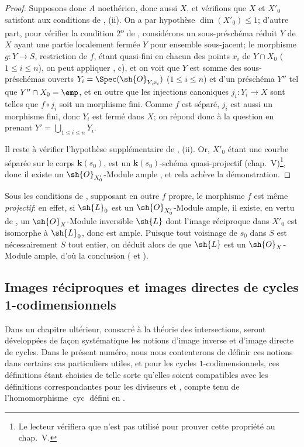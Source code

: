 \begin{proof}
Supposons donc $A$ noethérien, donc aussi $X$, et vérifions que $X$ et $X'_0$ satisfont aux conditions de , (ii).
On a par hypothèse $\dim(X'_0)\leq1$;
d'autre part, pour vérifier la condition 2\textsuperscript{o} de , considérons un sous-préschéma réduit $Y$ de $X$ ayant une partie localement fermée $Y$ pour ensemble sous-jacent;
le morphisme $g:Y\to S$, restriction de $f$, étant quasi-fini en chacun des points $x_i$ de $Y\cap X_0$ ($1\leq i\leq n$), on peut appliquer , c), et on voit que $Y$ est somme des sous-préschémas ouverts $Y_i=\Spec(\sh{O}_{Y,x_i})$ ($1\leq i\leq n$) et d'un préschéma $Y''$ tel que $Y''\cap X_0=\emp$, et en outre que les injections canoniques $j_i:Y_i\to X$ sont telles que $f\circ j_i$ soit un morphisme fini.
Comme $f$ est séparé, $j_i$ est aussi un morphisme fini, donc $Y_i$ est fermé dans $X$;
on répond donc à la question en prenant $Y'=\bigcup_{1\leq i\leq n}Y_i$.

Il reste à vérifier l'hypothèse supplémentaire de , (ii).
Or, $X'_0$ étant une courbe séparée sur le corps $\boldsymbol{k}(s_0)$, est un $\boldsymbol{k}(s_0)$-schéma quasi-projectif (chap.~V)\footnote{Le lecteur vérifiera que  n'est pas utilisé pour prouver cette propriété au chap.~V.}, donc il existe un $\sh{O}_{X'_0}$-Module ample , et cela achève la démonstration.
\end{proof}

\begin{remark}[21.9.13]
\label{IV.21.9.13}
Sous les conditions de , supposant en outre $f$ propre, le morphisme $f$ est même \emph{projectif}:
en effet, si $\sh{L}_0$ est un $\sh{O}_{X'_0}$-Module ample, il existe, en vertu de , un $\sh{O}_X$-Module inversible $\sh{L}$ dont l'image réciproque dans $X'_0$ est isomorphe à $\sh{L}_0$, donc est ample.
Puisque tout voisinage de $s_0$ dans $S$ est nécessairement $S$ tout entier, on déduit alors de  que $\sh{L}$ est un $\sh{O}_X$-Module ample, d'où la conclusion ( et ).
\end{remark}

\subsection{Images réciproques et images directes de cycles 1-codimensionnels}

Dans un chapitre ultérieur, consacré à la théorie des intersections, seront développées de façon systématique les notions d'image inverse et d'image directe de cycles.
Dans le présent numéro, nous nous contenterons de définir ces notions dans certains cas particuliers utiles, et pour les cycles $1$-codimensionnels, ces définitions étant choisies de telle sorte qu'elles soient compatibles avec les définitions correspondantes pour les diviseurs  et , compte tenu de l'homomorphisme $\operatorname{cyc}$ défini en .

